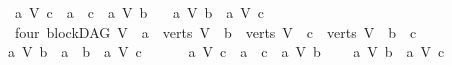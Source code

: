 \begin{isabellebody}
\ \ \ {\isasymnot}{\isacharparenleft}{\kern0pt}{\isacharparenleft}{\kern0pt}{\isacharparenleft}{\kern0pt}a\ {\isasymrightarrow}\isactrlsup {\isacharplus}{\kern0pt}\isactrlbsub V\isactrlesub \ c{\isacharparenright}{\kern0pt}\ {\isasymor}\ a\ {\isacharequal}{\kern0pt}\ c{\isacharparenright}{\kern0pt}\ {\isasymand}\ {\isasymnot}{\isacharparenleft}{\kern0pt}a\ {\isasymrightarrow}\isactrlsup {\isacharplus}{\kern0pt}\isactrlbsub V\isactrlesub \ b{\isacharparenright}{\kern0pt}{\isacharparenright}{\kern0pt}{\isasymand}\ \isanewline
\ \ {\isacharparenleft}{\kern0pt}{\isacharparenleft}{\kern0pt}a\ {\isasymrightarrow}\isactrlsup {\isacharplus}{\kern0pt}\isactrlbsub V\isactrlesub \ b{\isacharparenright}{\kern0pt}\ {\isasymand}\ {\isacharparenleft}{\kern0pt}a\ {\isasymrightarrow}\isactrlsup {\isacharplus}{\kern0pt}\isactrlbsub V\isactrlesub \ c{\isacharparenright}{\kern0pt}{\isacharparenright}{\kern0pt}{\isachardoublequoteclose}\isanewline
\ \ {\isacharbar}{\kern0pt}\ {\isacharparenleft}{\kern0pt}four{\isacharparenright}{\kern0pt}\ {\isachardoublequoteopen}{\isacharparenleft}{\kern0pt}blockDAG\ V\ {\isasymand}\ a\ {\isasymin}\ verts\ V\ {\isasymand}\ b\ {\isasymin}\ verts\ V\ {\isasymand}\ c\ {\isasymin}\ verts\ V{\isacharparenright}{\kern0pt}\ {\isasymand}\ b\ {\isasymnoteq}\ c\ \ {\isasymand}\isanewline
\ \ {\isasymnot}{\isacharparenleft}{\kern0pt}{\isacharparenleft}{\kern0pt}{\isacharparenleft}{\kern0pt}a\ {\isasymrightarrow}\isactrlsup {\isacharplus}{\kern0pt}\isactrlbsub V\isactrlesub \ b{\isacharparenright}{\kern0pt}\ {\isasymor}\ a\ {\isacharequal}{\kern0pt}\ b{\isacharparenright}{\kern0pt}\ {\isasymand}\ {\isasymnot}{\isacharparenleft}{\kern0pt}a\ {\isasymrightarrow}\isactrlsup {\isacharplus}{\kern0pt}\isactrlbsub V\isactrlesub \ c{\isacharparenright}{\kern0pt}{\isacharparenright}{\kern0pt}\ {\isasymand}\ \ \isanewline
\ \ \ {\isasymnot}{\isacharparenleft}{\kern0pt}{\isacharparenleft}{\kern0pt}{\isacharparenleft}{\kern0pt}a\ {\isasymrightarrow}\isactrlsup {\isacharplus}{\kern0pt}\isactrlbsub V\isactrlesub \ c{\isacharparenright}{\kern0pt}\ {\isasymor}\ a\ {\isacharequal}{\kern0pt}\ c{\isacharparenright}{\kern0pt}\ {\isasymand}\ {\isasymnot}{\isacharparenleft}{\kern0pt}a\ {\isasymrightarrow}\isactrlsup {\isacharplus}{\kern0pt}\isactrlbsub V\isactrlesub \ b{\isacharparenright}{\kern0pt}{\isacharparenright}{\kern0pt}{\isasymand}\ \ \isanewline
\ \ {\isasymnot}{\isacharparenleft}{\kern0pt}{\isacharparenleft}{\kern0pt}a\ {\isasymrightarrow}\isactrlsup {\isacharplus}{\kern0pt}\isactrlbsub V\isactrlesub \ b{\isacharparenright}{\kern0pt}\ {\isasymand}\ {\isacharparenleft}{\kern0pt}a\ {\isasymrightarrow}\isactrlsup {\isacharplus}{\kern0pt}\isactrlbsub V\isactrlesub \ c{\isacharparenright}{\kern0pt}{\isacharparenright}{\kern0pt}{\isachardoublequoteclose}\isanewline

\end{isabellebody}
